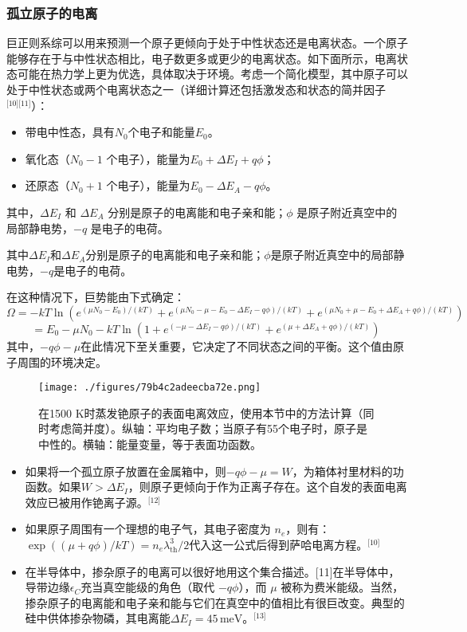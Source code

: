 \subsubsection{孤立原子的电离}
巨正则系综可以用来预测一个原子更倾向于处于中性状态还是电离状态。一个原子能够存在于与中性状态相比，电子数更多或更少的电离状态。如下面所示，电离状态可能在热力学上更为优选，具体取决于环境。考虑一个简化模型，其中原子可以处于中性状态或两个电离状态之一（详细计算还包括激发态和状态的简并因子\(^\text{[10][11]}\)）：
\begin{itemize}
\item 带电中性态，具有\( N_0 \)个电子和能量\( E_0 \)。
\item 氧化态（\( N_0 - 1 \) 个电子），能量为\( E_0 + \Delta E_I + q\phi \)；
\item 还原态（\( N_0 + 1 \) 个电子），能量为\( E_0 - \Delta E_A - q\phi \)。
\end{itemize}
其中，\( \Delta E_I \) 和 \( \Delta E_A \) 分别是原子的电离能和电子亲和能；\( \phi \) 是原子附近真空中的局部静电势，\( -q \) 是电子的电荷。

其中\( \Delta E_I \)和\( \Delta E_A \)分别是原子的电离能和电子亲和能；\(\phi\)是原子附近真空中的局部静电势，\( -q \)是电子的电荷。

在这种情况下，巨势能由下式确定：
\[
\Omega = -kT \ln \left( e^{(\mu N_0 - E_0)/(kT)} + e^{(\mu N_0 - \mu - E_0 - \Delta E_I - q\phi)/(kT)} + e^{(\mu N_0 + \mu - E_0 + \Delta E_A + q\phi)/(kT)} \right)~
\]
\[
= E_0 - \mu N_0 - kT \ln \left( 1 + e^{(-\mu - \Delta E_I - q\phi)/(kT)} + e^{(\mu + \Delta E_A + q\phi)/(kT)} \right)~
\]
其中，\( -q\phi - \mu \)在此情况下至关重要，它决定了不同状态之间的平衡。这个值由原子周围的环境决定。
\begin{figure}[ht]
\centering
\texttt{[image: ./figures/79b4c2adeecba72e.png]}
\caption{在1500 K时蒸发铯原子的表面电离效应，使用本节中的方法计算（同时考虑简并度）。纵轴：平均电子数；当原子有55个电子时，原子是中性的。横轴：能量变量，等于表面功函数。} \label{fig_JZXT_1}
\end{figure}
\begin{itemize}
\item 如果将一个孤立原子放置在金属箱中，则\( -q\phi - \mu = W \)，为箱体衬里材料的功函数。如果\( W > \Delta E_I \)，则原子更倾向于作为正离子存在。这个自发的表面电离效应已被用作铯离子源。\(^\text{[12]}\)
\item 如果原子周围有一个理想的电子气，其电子密度为 \( n_e \)，则有：\(\exp \left((\mu + q\phi)/kT\right) = n_e \lambda_{\text{th}}^{3}/2\)代入这一公式后得到萨哈电离方程。\(^\text{[10]}\)
\item 在半导体中，掺杂原子的电离可以很好地用这个集合描述。[11]在半导体中，导带边缘\( \epsilon_C \)充当真空能级的角色（取代 \( -q\phi\)），而 \( \mu \) 被称为费米能级。当然，掺杂原子的电离能和电子亲和能与它们在真空中的值相比有很巨改变。典型的硅中供体掺杂物磷，其电离能\( \Delta E_I = 45 \, \text{meV} \)。\(^\text{[13]}\)
\end{itemize}
